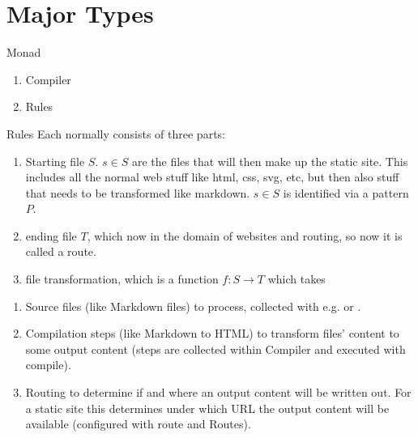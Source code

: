 \documentclass[openany, 12pt]{article}
\begin{document}
\maketitle{}

\tableofcontents

\section{Major Types}
\begin{definition}{Monad}{}
	\begin{multicols}{2}
		\begin{enumerate}[label = {(\arabic*)}]
			\item Compiler
			\item Rules
		\end{enumerate}
	\end{multicols}
\end{definition}

\begin{definition}{Rules}{}
	Each  normally consists of three parts:

	\begin{enumerate}[label = {(\arabic*)}]
		\item Starting file $S$.  $s \in S$ are the files that will then make up the
		      static site. This includes all the normal web stuff like html, css,
		      svg, etc, but then also stuff that needs to be transformed like
		      markdown. $s\in S$ is identified via a pattern $P$.
		\item ending file $T$, which now in the domain of websites and routing,
		      so now it is called a route.
		\item file transformation, which is a function $f: S \rightarrow T$
		      which takes
	\end{enumerate}

	\begin{enumerate}[label = {(\arabic*)}]
		\item Source files (like Markdown files) to process, collected with e.g.
		       or .
		\item Compilation steps (like Markdown to HTML) to transform files'
		      content to some output content (steps are collected within Compiler
		      and executed with compile).
		\item Routing to determine if and where an output content will be
		      written out. For a static site this determines under which URL the
		      output content will be available (configured with route and
		      Routes).
	\end{enumerate}
\end{definition}
\end{document}
